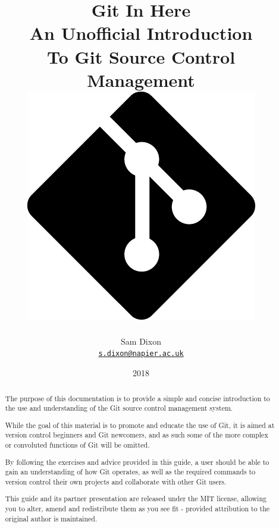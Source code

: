 \documentclass[10pt, a4paper, titlepage]{article}
\begin{document}
\title{ 
Git In Here\\
\large An Unofficial Introduction\\
To Git Source Control Management\\
\includegraphics[scale=0.4]{../res/git_icon}\\
}


\author{Sam Dixon\\
\texttt{\href{mailto:s.dixon@napier.ac.uk}{s.dixon@napier.ac.uk}}
}

\date{2018} 
\maketitle

\begin{abstract} The purpose of this documentation is to provide a simple and
concise introduction to the use and understanding of the Git source control
management system.

While the goal of this material is to promote and educate the use of Git, it
is aimed at version control beginners and Git newcomers, and as such some of
the more complex or convoluted functions of Git will be omitted.

By following the exercises and advice provided in this guide, a user should be
able to gain an understanding of how Git operates, as well as the required
commands to version control their own projects and collaborate with other Git
users.

This guide and its partner presentation are released under the MIT license,
allowing you to alter, amend and redistribute them as you see fit - provided
attribution to the original author is maintained. 
\end{abstract}
\end{document}
